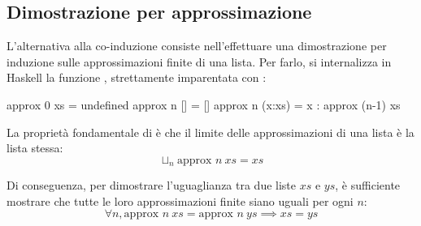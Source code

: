 \subsection{Dimostrazione per approssimazione}
L'alternativa alla co-induzione consiste nell'effettuare una dimostrazione per induzione sulle approssimazioni finite di una lista. Per farlo, si internalizza in Haskell la funzione , strettamente imparentata con :

\begin{haskellbox}{}
approx 0 xs = undefined
approx n [] = []
approx n (x:xs) = x : approx (n-1) xs
\end{haskellbox}

La proprietà fondamentale di  è che il limite delle approssimazioni di una lista è la lista stessa:
$$\sqcup_{n} \text{approx } n \ xs = xs$$

Di conseguenza, per dimostrare l'uguaglianza tra due liste $xs$ e $ys$, è sufficiente mostrare che tutte le loro approssimazioni finite siano uguali per ogni $n$:
$$\forall n, \text{approx } n \ xs = \text{approx } n \ ys \implies xs = ys$$

